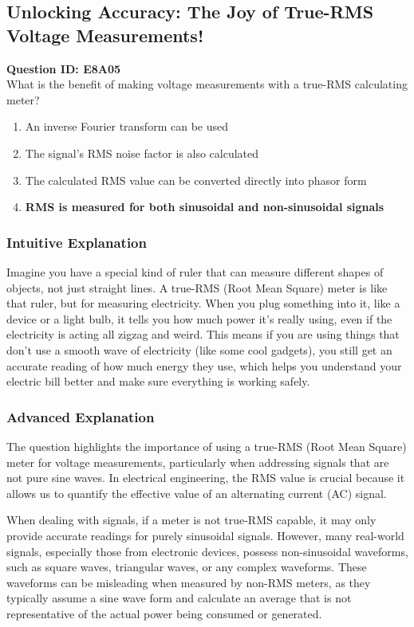 \subsection{Unlocking Accuracy: The Joy of True-RMS Voltage Measurements!}
\begin{tcolorbox}
\textbf{Question ID: E8A05} \\
What is the benefit of making voltage measurements with a true-RMS calculating meter? 
\begin{enumerate}[label=\Alph*.]
    \item An inverse Fourier transform can be used
    \item The signal’s RMS noise factor is also calculated
    \item The calculated RMS value can be converted directly into phasor form
    \item \textbf{RMS is measured for both sinusoidal and non-sinusoidal signals}
\end{enumerate}
\end{tcolorbox}

\subsubsection{Intuitive Explanation}
Imagine you have a special kind of ruler that can measure different shapes of objects, not just straight lines. A true-RMS (Root Mean Square) meter is like that ruler, but for measuring electricity. When you plug something into it, like a device or a light bulb, it tells you how much power it’s really using, even if the electricity is acting all zigzag and weird. This means if you are using things that don’t use a smooth wave of electricity (like some cool gadgets), you still get an accurate reading of how much energy they use, which helps you understand your electric bill better and make sure everything is working safely.

\subsubsection{Advanced Explanation}
The question highlights the importance of using a true-RMS (Root Mean Square) meter for voltage measurements, particularly when addressing signals that are not pure sine waves. In electrical engineering, the RMS value is crucial because it allows us to quantify the effective value of an alternating current (AC) signal.

When dealing with signals, if a meter is not true-RMS capable, it may only provide accurate readings for purely sinusoidal signals. However, many real-world signals, especially those from electronic devices, possess non-sinusoidal waveforms, such as square waves, triangular waves, or any complex waveforms. These waveforms can be misleading when measured by non-RMS meters, as they typically assume a sine wave form and calculate an average that is not representative of the actual power being consumed or generated.

